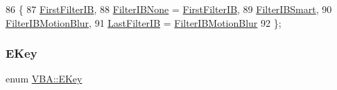 \begin{DoxyCode}
86 \{
87   \mbox{\hyperlink{class_v_b_a_a304ffeb9f4a8b26e7fa4e2eb620d780fa82ad08b7cb0fb3a1705da0378852dd77}{FirstFilterIB}},
88   \mbox{\hyperlink{class_v_b_a_a304ffeb9f4a8b26e7fa4e2eb620d780fab054f4d5f2444fb31370e618cfe85eb7}{FilterIBNone}} = \mbox{\hyperlink{class_v_b_a_a304ffeb9f4a8b26e7fa4e2eb620d780fa82ad08b7cb0fb3a1705da0378852dd77}{FirstFilterIB}},
89   \mbox{\hyperlink{class_v_b_a_a304ffeb9f4a8b26e7fa4e2eb620d780fac1cd2d227ad1026f772ed5cef553199b}{FilterIBSmart}},
90   \mbox{\hyperlink{class_v_b_a_a304ffeb9f4a8b26e7fa4e2eb620d780fa2d6d23375f2b61bac1fabffffd25d6ed}{FilterIBMotionBlur}},
91   \mbox{\hyperlink{class_v_b_a_a304ffeb9f4a8b26e7fa4e2eb620d780fafca057c0928de0cb32742728aabd6354}{LastFilterIB}} = \mbox{\hyperlink{class_v_b_a_a304ffeb9f4a8b26e7fa4e2eb620d780fa2d6d23375f2b61bac1fabffffd25d6ed}{FilterIBMotionBlur}}
92 \};
\end{DoxyCode}
\mbox{\label{class_v_b_a_a5839ea5408735bd8ce070c4c245750cc}} 
\subsubsection{\texorpdfstring{E\+Key}{EKey}}
{\footnotesize\ttfamily enum \mbox{\hyperlink{class_v_b_a_a5839ea5408735bd8ce070c4c245750cc}{V\+B\+A\+::\+E\+Key}}}

